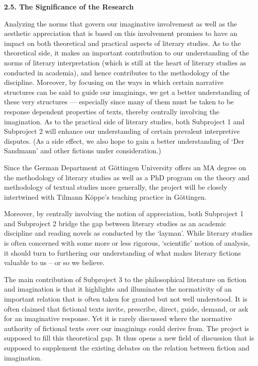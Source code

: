 \vspace{.2cm}
\textbf{2.5.  The Significance of the Research}
\vspace{.2cm}

Analyzing the norms that govern our imaginative involvement as well as the aesthetic appreciation that is based on this involvement promises to have an impact on both theoretical and practical aspects of literary studies. As to the theoretical side, it makes an important contribution to our understanding of the norms of literary interpretation (which is still at the heart of literary studies as conducted in academia), and hence contributes to the methodology of the discipline. Moreover, by focusing on the ways in which certain narrative structures can be said to guide our imaginings, we get a better understanding of these very structures --- especially since many of them must be taken to be response dependent properties of texts, thereby centrally involving the imagination. As to the practical side of literary studies, both Subproject 1 and Subproject 2 will enhance our understanding of certain prevalent interpretive disputes. (As a side effect, we also hope to gain a better understanding of `Der Sandmann' and other fictions under consideration.)
 
Since the German Department at G\"ottingen University offers an MA degree on the methodology of literary studies as well as a PhD program on the theory and methodology of textual studies more generally, the project will be closely intertwined with Tilmann K\"oppe's teaching practice in G\"ottingen.
 
Moreover, by centrally involving the notion of appreciation, both Subproject 1 and Subproject 2 bridge the gap between literary studies as an academic discipline and reading novels as conducted by the `layman'. While literary studies is often concerned with some more or less rigorous, `scientific' notion of analysis, it should turn to furthering our understanding of what makes literary fictions valuable to us -- or so we believe. 

The main contribution of Subproject 3 to the philosophical literature on fiction and imagination is that it highlights and illuminates the normativity of an important relation that is often taken for granted but not well understood. It is often claimed that fictional texts invite, prescribe, direct, guide, demand, or ask for an imaginative response. Yet it is rarely discussed where the normative authority of fictional texts over our imaginings could derive from. The project is supposed to fill this theoretical gap. It thus opens a new field of discussion that is supposed to supplement the existing debates on the relation between fiction and imagination. 

